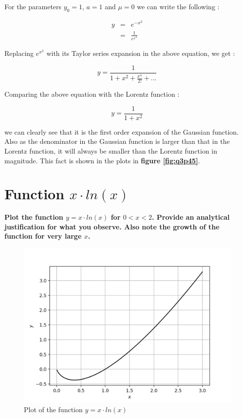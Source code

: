 \documentclass[12]{article}
\begin{document}
    For the parameters $y_0 = 1$, $a = 1$ and $\mu = 0$ we can write the following :
    
    
    \begin{eqnarray}
        y &=& e^{-x^2} \nonumber \\
        &=& \frac{1}{e^{x^2}} \nonumber
    \end{eqnarray}
    
    Replacing $e^{x^2}$ with its Taylor series expansion in the above equation, we get :
    
    \begin{equation}
        y = \frac{1}{1+x^2+\frac{x^4}{2!}+...} \nonumber 
    \end{equation}
    
    Comparing the above equation with the Lorentz function :
    
    \begin{equation}
        y = \frac{1}{1+x^2}
    \end{equation}
    
    we can clearly see that it is the first order expansion of the Gaussian function. Also as the denominator in the Gaussian function is larger than that in the Lorentz function, it will always be smaller than the Lorentz function in magnitude. This fact is shown in the plots in \textbf{figure \ref{fig:q3p45}}.
    
    \newpage
    \section{Function $x\cdot ln(x)$}
    \textbf{Plot the function $y = x\cdot ln(x)$ for $0< x <2$. Provide an analytical justification for what you observe. Also note the growth of the function for very large $x$.}
    
    \begin{figure}[H]
        \centering
        \includegraphics[width=\textwidth]{plots/q4p1.png}
        \caption{Plot of the function $y = x\cdot ln(x)$}
        \label{fig:q4p1}
    \end{figure}
    
\end{document}
